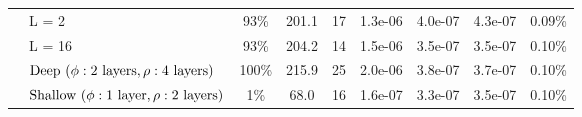 \begin{tabular}{llccccccc}
          & L = 2 &                        93\% &                                     201.1 &                       17 &                                   1.3e-06 &                                 4.0e-07 &                                  4.3e-07 &                                             0.09\% \\
          & L = 16 &                        93\% &                                     204.2 &                       14 &                                   1.5e-06 &                                 3.5e-07 &                                  3.5e-07 &                                             0.10\% \\
          & $\textup{Deep}~(\phi:\textup{2 layers},  \rho:\textup{4 layers})$ &                       100\% &                                     215.9 &                       25 &                                   2.0e-06 &                                 3.8e-07 &                                  3.7e-07 &                                             0.10\% \\
          & $\textup{Shallow}~(\phi:\textup{1 layer},  \rho:\textup{2 layers})$ &                         1\% &                                      68.0 &                       16 &                                   1.6e-07 &                                 3.3e-07 &                                  3.5e-07 &                                             0.10\% \\
\bottomrule
\end{tabular}
